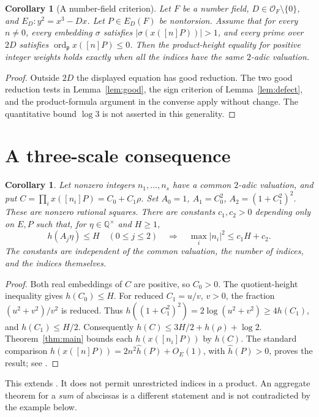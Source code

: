 \documentclass[11pt,a4paper]{article}
\newtheorem{corollary}[theorem]{Corollary}
\newcommand{\Q}{\mathbb Q}\newcommand{\Z}{\mathbb Z}
\DeclareMathOperator{\ord}{ord}\DeclareMathOperator{\N}{N}
\begin{document}
\begin{corollary}[A number-field criterion]\label{cor:general}
Let $F$ be a number field, $D\in\mathcal O_F\setminus\{0\}$, and
$E_D:y^2=x^3-Dx$. Let $P\in E_D(F)$ be nontorsion.
Assume that for every $n\ne0$, every embedding $\sigma$ satisfies
$|\sigma(x([n]P))|>1$, and every prime over $2D$ satisfies
$\ord_{\mathfrak p}x([n]P)\le0$.
Then the product-height equality for positive integer weights holds
exactly when all the indices have the same $2$-adic valuation.
\end{corollary}
\begin{proof}
Outside $2D$ the displayed equation has good reduction. The two good
reduction tests in Lemma~\ref{lem:good}, the sign criterion of
Lemma~\ref{lem:defect}, and the product-formula argument in the converse
apply without change. The quantitative bound $\log3$ is not asserted
in this generality.
\end{proof}

\section{A three-scale consequence}
\begin{corollary}\label{cor:scales}
Let nonzero integers $n_1,\ldots,n_s$ have a common $2$-adic valuation,
and put $C=\prod_i x([n_i]P)=C_0+C_1\rho$.
Set $A_0=1$, $A_1=C_0^2$, $A_2=(1+C_1^2)^2$.
These are nonzero rational squares. There are constants $c_1,c_2>0$
depending only on $E,P$ such that, for $\eta\in\Q^\times$ and $H\ge1$,
\[
 h(A_j\eta)\le H\quad(0\le j\le2)
 \quad\Longrightarrow\quad \max_i|n_i|^2\le c_1H+c_2.
\]
The constants are independent of the common valuation, the number of
indices, and the indices themselves.
\end{corollary}
\begin{proof}
Both real embeddings of $C$ are positive, so $C_0>0$.
The quotient-height inequality gives $h(C_0)\le H$.
For reduced $C_1=u/v$, $v>0$, the fraction
$(u^2+v^2)/v^2$ is reduced. Thus
$h((1+C_1^2)^2)=2\log(u^2+v^2)\ge4h(C_1)$, and $h(C_1)\le H/2$.
Consequently $h(C)\le3H/2+h(\rho)+\log2$.
Theorem~\ref{thm:main} bounds each $h(x([n_i]P))$ by $h(C)$.
The standard comparison $h(x([n]P))=2n^2\widehat h(P)+O_E(1)$,
with $\widehat h(P)>0$, proves the result; see
\cite[Chapter VIII, Section 9]{Silverman}.
\end{proof}
This extends \cite[Corollary 2.4]{Sun}. It does not permit unrestricted
indices in a product. An aggregate theorem for a \emph{sum} of abscissas
is a different statement and is not contradicted by the example below.
\end{document}
